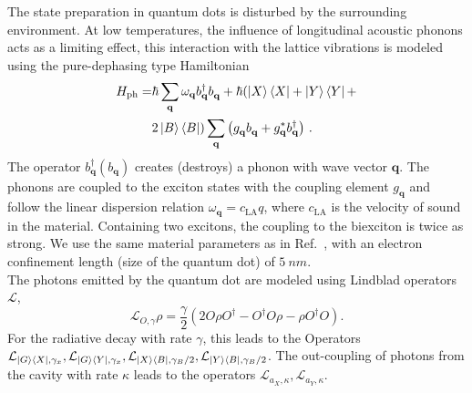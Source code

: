\documentclass[%
 reprint,superscriptaddress,
 amsmath,amssymb,
 aps]{revtex4-2}
\begin{document}
The state preparation in quantum dots is disturbed by the surrounding environment. At low temperatures, the influence of longitudinal acoustic phonons acts as a limiting effect, this interaction with the lattice vibrations is modeled using the pure-dephasing type Hamiltonian
\begin{align}
\begin{split}
    H_\text{ph}= &\hbar \sum_{\mathbf{q}} \omega_{\mathbf{q}} b_{\mathbf{q}}^{\dagger} b_{\mathbf{q}}^{} +\hbar (\ket{X}\bra{X} + \ket{Y}\bra{Y} + \\
    & 2\ket{B}\bra{B} ) \sum_{\mathbf{q}} \left(g_{\mathbf{q}}^{} b_{\mathbf{q}}^{} + g_{\mathbf{q}}^* b_{\mathbf{q}}^{\dagger} \right)\,.
\end{split}
\end{align}
The operator $b_{\mathbf{q}}^{\dagger} (b^{}_\mathbf{q})$ creates (destroys) a phonon with wave vector $\mathbf{q}$. The phonons are coupled to the exciton states with the coupling element $g_\mathbf{q}$ and follow the linear dispersion relation $\omega_{\mathbf{q}} =c_{\text{LA}}q$, where $c_{\text{LA}}$ is the velocity of sound in the material. Containing two excitons, the coupling to the biexciton is twice as strong. We use the same material parameters as in Ref.~\cite{bracht2022phonon}, with an electron confinement length (size of the quantum dot) of $\SI{5}{nm}$.\\
The photons emitted by the quantum dot are modeled using Lindblad operators $\mathcal{L}$,
\begin{equation}
    \mathcal{L}_{{O},\gamma}\rho = \frac{\gamma}{2}\left(2{O}\rho{O}^\dagger - {O}^\dagger{O}\rho-\rho{O}^\dagger{O}\right).
\end{equation}
For the radiative decay with rate $\gamma$, this leads to the Operators $\mathcal{L}_{\ket{G}\bra{X},\gamma_x},\mathcal{L}_{\ket{G}\bra{Y},\gamma_x},\mathcal{L}_{\ket{X}\bra{B},\gamma_B/2},\mathcal{L}_{\ket{Y}\bra{B},\gamma_B/2}$. The out-coupling of photons from the cavity with rate $\kappa$ leads to the operators $\mathcal{L}_{a^{}_{X},\kappa}, \mathcal{L}_{a^{}_{Y},\kappa}$.
\end{document}
